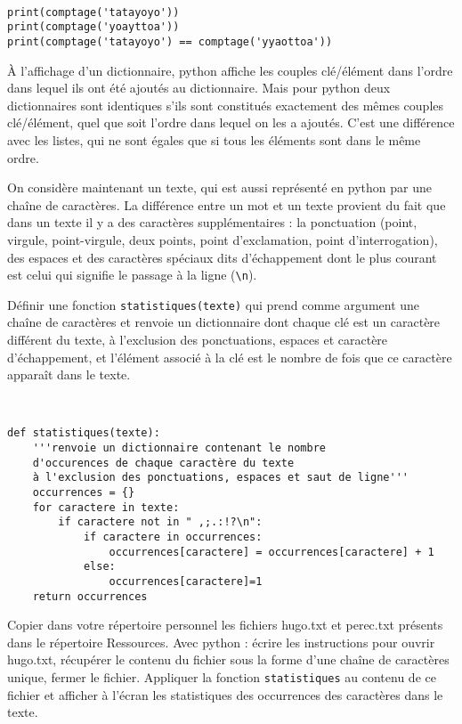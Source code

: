 \begin{solution}~\
\begin{verbatim}
print(comptage('tatayoyo'))
print(comptage('yoayttoa'))
print(comptage('tatayoyo') == comptage('yyaottoa'))
\end{verbatim}

À l'affichage d'un dictionnaire, python affiche les couples clé/élément dans l'ordre dans lequel ils ont été ajoutés au dictionnaire. Mais pour python deux dictionnaires sont identiques s'ils sont constitués exactement des mêmes couples clé/élément, quel que soit l'ordre dans lequel on les a ajoutés. C'est une différence avec les listes, qui ne sont égales que si tous les éléments sont dans le même ordre.
\end{solution}

\begin{exercice}
On considère maintenant un texte, qui est aussi représenté en python par une chaîne de caractères. La différence entre un mot et un texte provient du fait que dans un texte il y a des caractères supplémentaires : la ponctuation (point, virgule, point-virgule, deux points, point d'exclamation, point d'interrogation), des espaces et des caractères spéciaux dits d'échappement dont le plus courant est celui qui signifie le passage à la ligne (\verb?\n?).

Définir une fonction \texttt{statistiques(texte)} qui prend comme argument une chaîne de caractères et renvoie un dictionnaire dont chaque clé est un caractère différent du texte, à l'exclusion des ponctuations, espaces et caractère d'échappement, et l'élément associé à la clé est le nombre de fois que ce caractère apparaît dans le texte.
\end{exercice}

\begin{solution}~\
\begin{verbatim}
def statistiques(texte):
    '''renvoie un dictionnaire contenant le nombre
    d'occurences de chaque caractère du texte
    à l'exclusion des ponctuations, espaces et saut de ligne'''
    occurrences = {}
    for caractere in texte:
        if caractere not in " ,;.:!?\n":
            if caractere in occurrences:
                occurrences[caractere] = occurrences[caractere] + 1
            else:
                occurrences[caractere]=1
    return occurrences
\end{verbatim}
\end{solution}

\begin{exercice}
Copier dans votre répertoire personnel les fichiers hugo.txt et perec.txt présents dans le répertoire Ressources. Avec python : écrire les instructions pour ouvrir hugo.txt, récupérer le contenu du fichier sous la forme d'une chaîne de caractères unique, fermer le fichier. Appliquer la fonction \texttt{statistiques} au contenu de ce fichier et afficher à l'écran les statistiques des occurrences des caractères dans le texte.
\end{exercice}

